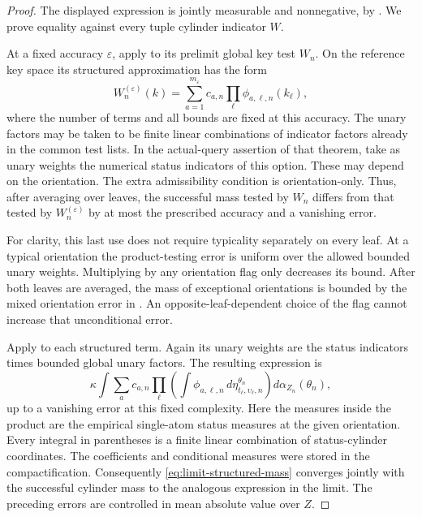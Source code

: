 \begin{proof}
The displayed expression is jointly measurable and nonnegative, by
. We prove equality against every tuple cylinder
indicator $W$.

At a fixed accuracy $\varepsilon$, apply
 to its prelimit global key test $W_n$.
On the reference key space its structured approximation has the form
\[
W_n^{(\varepsilon)}(k)
=\sum_{a=1}^{m_\varepsilon} c_{a,n}
        \prod_{\ell}\phi_{a,\ell,n}(k_\ell),
\]
where the number of terms and all bounds are fixed at this accuracy.
The unary factors may be taken to be finite linear combinations of
indicator factors already in the common test lists. In the
actual-query assertion of that theorem, take as unary weights the
numerical status indicators of this option. These may depend on the
orientation. The extra admissibility condition is orientation-only.
Thus, after averaging over leaves, the successful mass tested by $W_n$
differs from that tested by $W_n^{(\varepsilon)}$ by at most the
prescribed accuracy and a vanishing error.

For clarity, this last use does not require typicality separately on
every leaf. At a typical orientation the product-testing error is
uniform over the allowed bounded unary weights. Multiplying by any
orientation flag only decreases its bound. After both leaves are
averaged, the mass of exceptional orientations is bounded by the mixed
orientation error in . An opposite-leaf-dependent
choice of the flag cannot increase that unconditional error.

Apply  to each structured term. Again its unary
weights are the status indicators times bounded global unary factors.
The resulting expression is
\begin{equation}
\label{eq:limit-structured-mass}
\kappa\int\sum_a c_{a,n}
 \prod_\ell\left(
   \int\phi_{a,\ell,n}\,d\eta^{\theta_n}_{t_\ell,\upsilon_\ell,n}
             \right)d\alpha_{Z_n}(\theta_n),
\end{equation}
up to a vanishing error at this fixed complexity. Here the measures
inside the product are the empirical single-atom status measures at
the given orientation. Every integral in parentheses is a finite
linear combination of status-cylinder coordinates. The coefficients
and conditional measures were stored in the compactification.
Consequently \eqref{eq:limit-structured-mass} converges jointly with
the successful cylinder mass to the analogous expression in the limit.
The preceding errors are controlled in mean absolute value over $Z$.


\end{proof}
